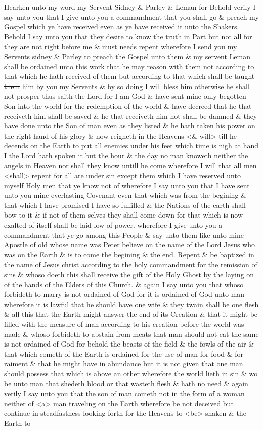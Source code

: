 				Hearken unto my word my Servent Sidney \& Parley \& Leman for Behold verily I say unto you that I give unto you a commandment that you shall go \& preach my Gospel which ye have received even as ye have received it unto the Shakers. Behold I say unto you that they desire to know the truth in Part but not all for they are not right before me \& must needs repent wherefore I send you my Servents sidney \& Parley to preach the Gospel unto them \& my servent Leman shall be ordained unto this work that he may reason with them not according to that which he hath received of them but according to that which shall be taught \sout{them} him by you my Servents \& by so doing I will bless him otherwise he shall not prosper thus saith the Lord for I am God \& have sent mine only begotten Son into the world for the redemption of the world \& have decreed that he that receiveth him shall be saved \& he that receiveth him not shall be damned \& they have done unto the Son of man even as they listed \& he hath taken his power on the right hand of his glory \& now reigneth in the Heavens \sout{<\& will>} till he decends on the Earth to put all enemies under his feet which time is nigh at hand I the Lord hath spoken it but the hour \& the day no man knoweth neither the angels in Heaven nor shall they know untill he come wherefore I will that all men <shall> repent for all are under sin except them which I have reserved unto myself Holy men that ye know not of wherefore I say unto you that I have sent unto you mine everlasting Covenant even that which was from the begining \& that which I have promised I have so fulfilled \& the Nations of the earth shall bow to it \& if not of them selves they shall come down for that which is now exalted of itself shall be laid low of power. wherefore I give unto you a commandment that ye go among this People \& say unto them like unto mine Apostle of old whose name was Peter believe on the name of the Lord Jesus who was on the Earth \& is to come the begining \& the end. Repent \& be baptized in the name of Jesus christ according to the holy commandment for the remission of sins \& whoso doeth this shall receive the gift of the Holy Ghost by the laying on of the hands of the Elders of this Church. \& again I say unto you that whoso forbideth to marry is not ordained of God for it is ordained of God unto man wherefore it is lawful that he should have one wife \& they twain shall be one flesh \& all this that the Earth might answer the end of its Creation \& that it might be filled with the measure of man according to his creation before the world was made \& whoso forbideth to abstain from meats that man should not eat the same is not ordained of God for behold the beasts of the field \& the fowls of the air \& that which cometh of the Earth is ordained for the use of man for food \& for raiment \& that he might have in abundance but it is not given that one man should possess that which is above an other wherefore the world lieth in sin \& wo be unto man that shedeth blood or that wasteth flesh \& hath no need \& again verily I say unto you that the son of man cometh not in the form of a woman neither of <a> man traveling on the Earth wherefore be not deceived but continue in steadfastness looking forth for the Heavens to <be> shaken \& the Earth to 